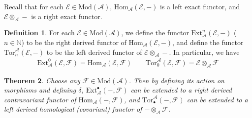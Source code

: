 \documentclass[12pt,b5paper,notitlepage]{report}
\theoremstyle{definition}
\newtheorem{df}{Definition}[section]
\theoremstyle{plain}
\newtheorem{thm}[df]{Theorem}
\newcommand{\mc}{\mathcal}
\newcommand{\Hom}{\mathrm{Hom}}
\newcommand{\blt}{\bullet}
\newcommand{\Nbb}{\mathbb N}
\newcommand{\Ext}{\mathrm{Ext}}
\newcommand{\Tor}{\mathrm{Tor}}
\newcommand{\Mod}{\mathrm{Mod}}
\numberwithin{equation}{section}
\begin{document}
Recall that for each $\mc E\in\Mod(\mc A)$, $\Hom_{\mc A}(\mc E,-)$ is a left exact functor, and $\mc E\otimes_{\mc A}-$ is a right exact functor.

\begin{df}
For each $\mc E\in\Mod(\mc A)$, we define the functor $\Ext^n_{\mc A}(\mc E,-)$ ($n\in\Nbb$) to be the right derived functor of $\Hom_{\mc A}(\mc E,-)$, and define the functor $\Tor_n^{\mc A}(\mc E,-)$ to be the left derived functor of $\mc E\otimes_{\mc A}-$. In particular, we have
\begin{align*}
\Ext^0_{\mc A}(\mc E,\mc F)=\Hom_{\mc A}(\mc E,\mc F)\qquad \Tor_0^{\mc A}(\mc E,\mc F)=\mc E\otimes_{\mc A}\mc F
\end{align*}
\end{df}



\begin{thm}\label{lb257}
Choose any $\mc F\in\Mod(\mc A)$. Then by defining its action on morphisms and defining $\delta$, $\Ext^\blt_{\mc A}(-,\mc F)$ can be extended to a right derived contravariant functor  of $\Hom_{\mc A}(-,\mc F)$, and $\Tor^{\mc A}_\blt(-,\mc F)$ can be extended to a left derived homological (covariant) functor of $-\otimes_{\mc A}\mc F$.
\end{thm}
\end{document}
